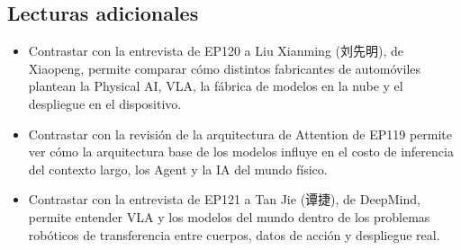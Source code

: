 \subsection{Lecturas adicionales}

\begin{itemize}
\item Contrastar con la entrevista de EP120 a Liu Xianming (刘先明), de Xiaopeng, permite comparar cómo distintos fabricantes de automóviles plantean la Physical AI, VLA, la fábrica de modelos en la nube y el despliegue en el dispositivo.
\item Contrastar con la revisión de la arquitectura de Attention de EP119 permite ver cómo la arquitectura base de los modelos influye en el costo de inferencia del contexto largo, los Agent y la IA del mundo físico.
\item Contrastar con la entrevista de EP121 a Tan Jie (谭捷), de DeepMind, permite entender VLA y los modelos del mundo dentro de los problemas robóticos de transferencia entre cuerpos, datos de acción y despliegue real.
\end{itemize}


